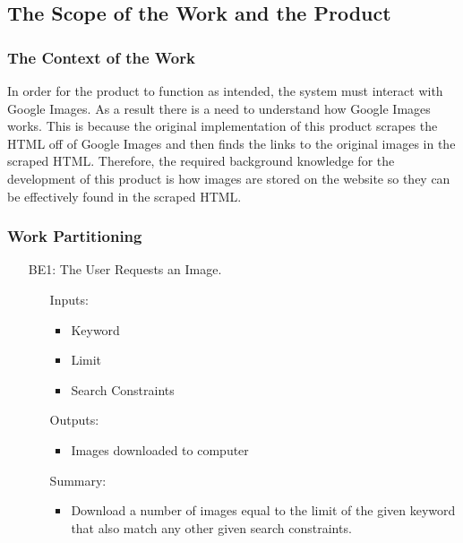 \documentclass[12pt, titlepage]{article}
\begin{document}
\subsection{The Scope of the Work and the Product}

\subsubsection{The Context of the Work}

In order for the product to function as intended, the system must interact with Google Images. As a result there is a need to understand how Google Images works. This is because the original implementation of this product scrapes the HTML off of Google Images and then finds the links to the original images in the scraped HTML. Therefore, the required background knowledge for the development of this product is how images are stored on the website so they can be effectively found in the scraped HTML. 

\subsubsection{Work Partitioning}

\begin{enumerate}
    \item [BE1:] The User Requests an Image.
        \begin{itemize}[wide=0pt, leftmargin=*]
            \item [Inputs:] \phantom{empty}
                \begin{itemize} [wide=0pt, leftmargin=*]
                    \item Keyword
                    \item Limit
                    \item Search Constraints
                \end{itemize}
                
            \item [Outputs:] \phantom{empty}
                \begin{itemize} [wide=0pt, leftmargin=*]
                    \item Images downloaded to computer
                \end{itemize}
            \item [Summary:] \phantom{empty}
                \begin{itemize} [wide=0pt, leftmargin=*]
                    \item Download a number of images equal to the limit of the given keyword that also match any other given search constraints.
                \end{itemize}
        \end{itemize}
\end{enumerate}
\end{document}
